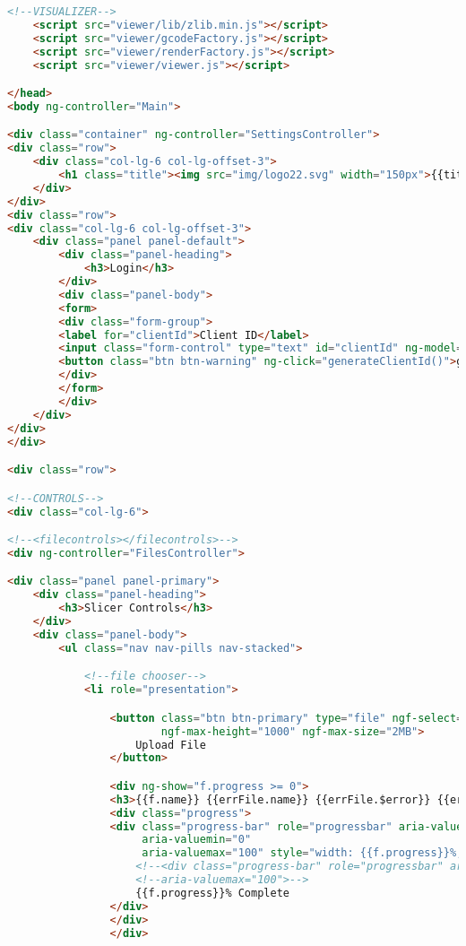 \begin{lstlisting}[language=HTML, label={lst:index}, caption=As this is a single page web application this is the only HTML file. It contains all of the libraries needed to run all subsequent sections.]
    <!--VISUALIZER-->
    <script src="viewer/lib/zlib.min.js"></script>
    <script src="viewer/gcodeFactory.js"></script>
    <script src="viewer/renderFactory.js"></script>
    <script src="viewer/viewer.js"></script>

</head>
<body ng-controller="Main">

<div class="container" ng-controller="SettingsController">
<div class="row">
    <div class="col-lg-6 col-lg-offset-3">
        <h1 class="title"><img src="img/logo22.svg" width="150px">{{title}}</h1>
    </div>
</div>
<div class="row">
<div class="col-lg-6 col-lg-offset-3">
    <div class="panel panel-default">
        <div class="panel-heading">
            <h3>Login</h3>
        </div>
        <div class="panel-body">
        <form>
        <div class="form-group">
        <label for="clientId">Client ID</label>
        <input class="form-control" type="text" id="clientId" ng-model="$root.clientId">
        <button class="btn btn-warning" ng-click="generateClientId()">generate new id</button>
        </div>
        </form>
        </div>
    </div>
</div>
</div>

<div class="row">

<!--CONTROLS-->
<div class="col-lg-6">

<!--<filecontrols></filecontrols>-->
<div ng-controller="FilesController">

<div class="panel panel-primary">
    <div class="panel-heading">
        <h3>Slicer Controls</h3>
    </div>
    <div class="panel-body">
        <ul class="nav nav-pills nav-stacked">

            <!--file chooser-->
            <li role="presentation">

                <button class="btn btn-primary" type="file" ngf-select="uploadFile($file,$invalidFiles)"
                        ngf-max-height="1000" ngf-max-size="2MB">
                    Upload File
                </button>

                <div ng-show="f.progress >= 0">
                <h3>{{f.name}} {{errFile.name}} {{errFile.$error}} {{errFile.$errorParam}}</h3>
                <div class="progress">
                <div class="progress-bar" role="progressbar" aria-valuenow="{{f.progress}}"
                     aria-valuemin="0"
                     aria-valuemax="100" style="width: {{f.progress}}%;">
                    <!--<div class="progress-bar" role="progressbar" aria-valuenow="{{f.progress}}" aria-valuemin="0"-->
                    <!--aria-valuemax="100">-->
                    {{f.progress}}% Complete
                </div>
                </div>
                </div>


\end{lstlisting}
